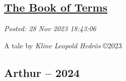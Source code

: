 %

%
%
%

\subsection*{\href{http://analyzethedatanotthedrivel.org/2023/11/28/the-book-of-terms/}{The Book of Terms}}


\noindent\emph{Posted: 28 Nov 2023 18:43:06}
\vspace{6pt}

A tale by \emph{Kline Leopold Hedrös} ©2023

\hypertarget{arthur-2024}{%
\subsection*{­Arthur -- 2024}\label{arthur-2024}}

